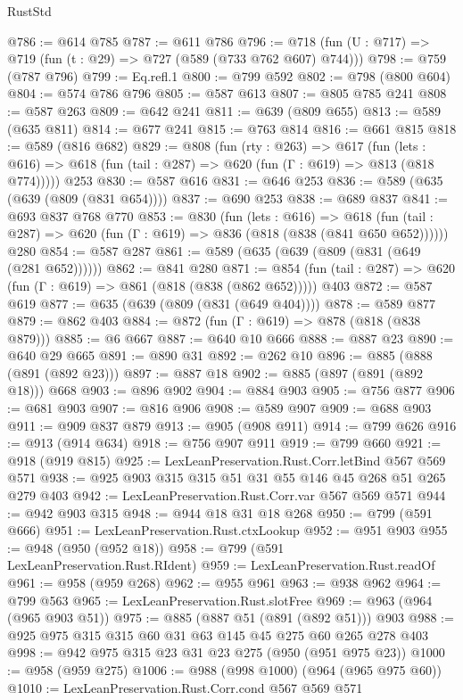 \begin{lexlean}{RustStd}
\begin{coremodule}
@786 := @614 @785
@787 := @611 @786
@796 := @718 (fun (U : @717) => @719 (fun (t : @29) => @727 (@589 (@733 @762 @607) @744)))
@798 := @759 (@787 @796)
@799 := Eq.refl.{1}
@800 := @799 @592
@802 := @798 (@800 @604)
@804 := @574 @786 @796
@805 := @587 @613
@807 := @805 @785 @241
@808 := @587 @263
@809 := @642 @241
@811 := @639 (@809 @655)
@813 := @589 (@635 @811)
@814 := @677 @241
@815 := @763 @814
@816 := @661 @815
@818 := @589 (@816 @682)
@829 := @808
    (fun (rty : @263) =>
    @617
      (fun (lets : @616) => @618 (fun (tail : @287) => @620 (fun (Γ : @619) => @813 (@818 @774)))))
    @253
@830 := @587 @616
@831 := @646 @253
@836 := @589 (@635 (@639 (@809 (@831 @654))))
@837 := @690 @253
@838 := @689 @837
@841 := @693 @837 @768 @770
@853 := @830
    (fun (lets : @616) =>
    @618 (fun (tail : @287) => @620 (fun (Γ : @619) => @836 (@818 (@838 (@841 @650 @652))))))
    @280
@854 := @587 @287
@861 := @589 (@635 (@639 (@809 (@831 (@649 (@281 @652))))))
@862 := @841 @280
@871 := @854 (fun (tail : @287) => @620 (fun (Γ : @619) => @861 (@818 (@838 (@862 @652))))) @403
@872 := @587 @619
@877 := @635 (@639 (@809 (@831 (@649 @404))))
@878 := @589 @877
@879 := @862 @403
@884 := @872 (fun (Γ : @619) => @878 (@818 (@838 @879)))
@885 := @6 @667
@887 := @640 @10 @666
@888 := @887 @23
@890 := @640 @29 @665
@891 := @890 @31
@892 := @262 @10
@896 := @885 (@888 (@891 (@892 @23)))
@897 := @887 @18
@902 := @885 (@897 (@891 (@892 @18))) @668
@903 := @896 @902
@904 := @884 @903
@905 := @756 @877
@906 := @681 @903
@907 := @816 @906
@908 := @589 @907
@909 := @688 @903
@911 := @909 @837 @879
@913 := @905 (@908 @911)
@914 := @799 @626
@916 := @913 (@914 @634)
@918 := @756 @907 @911
@919 := @799 @660
@921 := @918 (@919 @815)
@925 := LexLeanPreservation.Rust.Corr.letBind @567 @569 @571
@938 := @925 @903 @315 @315 @51 @31 @55 @146 @45 @268 @51 @265 @279 @403
@942 := LexLeanPreservation.Rust.Corr.var @567 @569 @571
@944 := @942 @903 @315
@948 := @944 @18 @31 @18 @268
@950 := @799 (@591 @666)
@951 := LexLeanPreservation.Rust.ctxLookup
@952 := @951 @903
@955 := @948 (@950 (@952 @18))
@958 := @799 (@591 LexLeanPreservation.Rust.RIdent)
@959 := LexLeanPreservation.Rust.readOf
@961 := @958 (@959 @268)
@962 := @955 @961
@963 := @938 @962
@964 := @799 @563
@965 := LexLeanPreservation.Rust.slotFree
@969 := @963 (@964 (@965 @903 @51))
@975 := @885 (@887 @51 (@891 (@892 @51))) @903
@988 := @925 @975 @315 @315 @60 @31 @63 @145 @45 @275 @60 @265 @278 @403
@998 := @942 @975 @315 @23 @31 @23 @275 (@950 (@951 @975 @23))
@1000 := @958 (@959 @275)
@1006 := @988 (@998 @1000) (@964 (@965 @975 @60))
@1010 := LexLeanPreservation.Rust.Corr.cond @567 @569 @571

\end{coremodule}
\end{lexlean}

